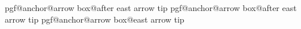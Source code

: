 {{                            \def\secondpoint{before south arrow}%
                        \else%
                            \def\firstpoint{before south arrow}%
                            \def\secondpoint{south east}%
                        \fi%
                    \fi%
                \else%
                        {\csname pgf@anchor@arrow box@after east arrow tip\endcsname}%
                    \ifdim\externalangle pt<\pgfmathresult pt\relax%
                        \pgfmathanglebetweenpoints{\referencepoint}%
                            {\csname pgf@anchor@arrow box@after east arrow\endcsname}%
                        \ifdim\externalangle pt<\pgfmathresult pt\relax%
                            \def\firstpoint{south east}%
                            \def\secondpoint{after east arrow}%
                        \else%
                            \def\firstpoint{after east arrow}%
                            \def\secondpoint{after east arrow head}%
                        \fi%
                    \else%
                        \def\firstpoint{after east arrow tip}%
                        \def\secondpoint{east arrow tip}%
                    \fi%
                \fi%
            \fi%
        \fi%
            {\csname pgf@anchor@arrow box@\firstpoint\endcsname}%
            {\csname pgf@anchor@arrow box@\secondpoint\endcsname}%
    }%
}%




\endinput
